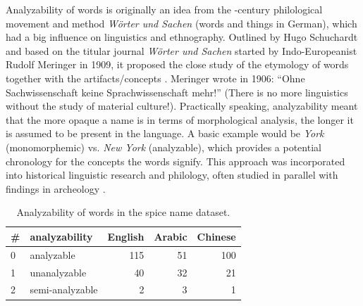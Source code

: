 Analyzability of words is originally an idea from the -century philological movement and method \textit{Wörter und Sachen} (words and things in German), which had a big influence on linguistics and ethnography. Outlined by Hugo Schuchardt and based on the titular journal \textit{Wörter und Sachen} started by Indo-Europeanist Rudolf Meringer in 1909, it proposed the close study of the etymology of words together with the artifacts/concepts \autocite{ortutay_magyar_1977}. Meringer wrote in 1906: ``Ohne Sachwissenschaft keine Sprachwissenschaft mehr!'' (There is no more linguistics without the study of material culture!). Practically speaking, analyzability meant that the more opaque a name is in terms of morphological analysis, the longer it is assumed to be present in the language. A basic example would be \textit{York} (monomorphemic) vs. \textit{New York} (analyzable), which provides a potential chronology for the concepts the words signify. This approach was incorporated into historical linguistic research and philology, often studied in parallel with findings in archeology \autocite{ortutay_magyar_1977}.


\begin{table}
  \centering
  \begin{tabular}{@{}llrrr@{}}
  \toprule
  \textbf{\#} & \textbf{analyzability} & \textbf{English} & \textbf{Arabic} & \textbf{Chinese} \\ \midrule
  0           & analyzable             & 115              & 51              & 100              \\
  1           & unanalyzable           & 40               & 32              & 21               \\
  2           & semi-analyzable        & 2                & 3               & 1                \\ \bottomrule
  \end{tabular}
  \caption{Analyzability of words in the spice name dataset.}
  \label{table:analyzability}
  \end{table}

